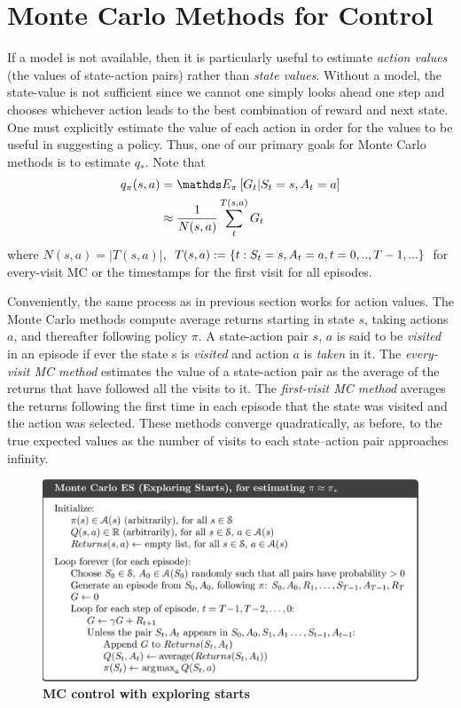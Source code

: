 \documentclass[11pt]{article}
\begin{document}
\section{Monte Carlo Methods for Control}
If a model is not available, then it is particularly useful to estimate \emph{action values} (the values of state-action pairs) rather than \emph{state values}. Without a model, the state-value is not sufficient since we cannot one simply looks ahead one step and chooses whichever action leads to the best combination of reward and next state.  One must explicitly estimate the value of each action in order for the values to be useful in suggesting a policy. Thus, one of our primary goals for Monte Carlo methods is to estimate $q_{*}$. Note that 
\begin{align*}
q_{\pi}(s, a) &= \E{\pi}{G_{t} | S_{t} = s, A_{t} = a} \\
&\approx \frac{1}{N(s, a)}\sum_{t}^{T(s,a)}G_{t}
\end{align*} where $N(s,a) = |T(s,a)|$, $T(s,a):=\left\{t: S_{t} = s, A_{t} = a, t=0,..,T-1, ...\right\}$ for every-visit MC or the timestamps for the first visit for all episodes. 

Conveniently, the same process as in previous section works for action values.  The Monte Carlo methods compute average returns starting in state $s$, taking actions $a$,  and thereafter following policy $\pi$. A state-action pair $s$, $a$ is said to be \emph{visited} in an episode if ever the state s is \emph{visited} and action $a$ is \emph{taken} in it. The \emph{every-visit MC method} estimates the value of a state-action pair as the average of the returns that have followed all the visits to it. The \emph{first-visit MC method} averages the returns following the first time in each episode that the state was visited and the action was selected. These methods converge quadratically, as before, to the true expected values as the number of visits to each state–action pair approaches infinity.

\begin{figure}
\begin{minipage}[t]{1\linewidth}
  \centering
  \centerline{\includegraphics[scale = 0.3]{MC_ES.png}}
\end{minipage}
\caption{\footnotesize{\textbf{MC control with exploring starts}}}
\label{fig: MC_ES}
\end{figure}
\end{document}
